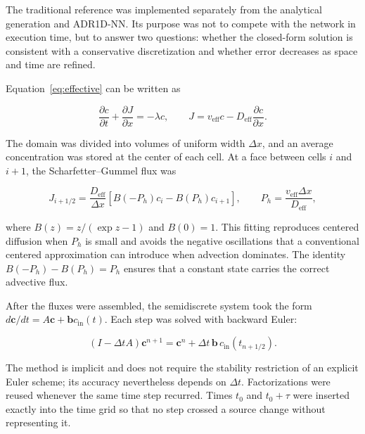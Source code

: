 \documentclass[11pt,a4paper]{article}
\begin{document}
The traditional reference was implemented separately from the analytical
generation and ADR1D-NN. Its purpose was not to compete with the network in
execution time, but to answer two questions: whether the closed-form solution
is consistent with a conservative discretization and whether error decreases
as space and time are refined.

Equation~\eqref{eq:effective} can be written as

\begin{equation}
\frac{\partial c}{\partial t}+\frac{\partial J}{\partial x}
=-\lambda c, \qquad
J=v_{\mathrm{eff}}c-D_{\mathrm{eff}}\frac{\partial c}{\partial x}.
\label{eq:conservative-form}
\end{equation}

The domain was divided into volumes of uniform width $\Delta x$, and an average
concentration was stored at the center of each cell. At a face between cells
$i$ and $i+1$, the Scharfetter--Gummel flux was \cite{scharfetter1969}

\begin{equation}
J_{i+1/2}=\frac{D_{\mathrm{eff}}}{\Delta x}
\left[B(-P_h)c_i-B(P_h)c_{i+1}\right],\qquad
P_h=\frac{v_{\mathrm{eff}}\Delta x}{D_{\mathrm{eff}}},
\label{eq:sg-flux}
\end{equation}

where $B(z)=z/(\exp z-1)$ and $B(0)=1$. This fitting reproduces centered
diffusion when $P_h$ is small and avoids the negative oscillations that a
conventional centered approximation can introduce when advection dominates.
The identity $B(-P_h)-B(P_h)=P_h$ ensures that a constant state carries the
correct advective flux.

After the fluxes were assembled, the semidiscrete system took the form
$d\mathbf c/dt=A\mathbf c+\mathbf b c_{\mathrm{in}}(t)$. Each step was solved
with backward Euler:

\begin{equation}
(I-\Delta t A)\mathbf c^{n+1}
=\mathbf c^n+\Delta t\,\mathbf b\,
c_{\mathrm{in}}(t_{n+1/2}).
\label{eq:backward-euler}
\end{equation}

The method is implicit and does not require the stability restriction of an
explicit Euler scheme; its accuracy nevertheless depends on $\Delta t$.
Factorizations were reused whenever the same time step recurred. Times $t_0$
and $t_0+\tau$ were inserted exactly into the time grid so that no step crossed
a source change without representing it.
\end{document}
